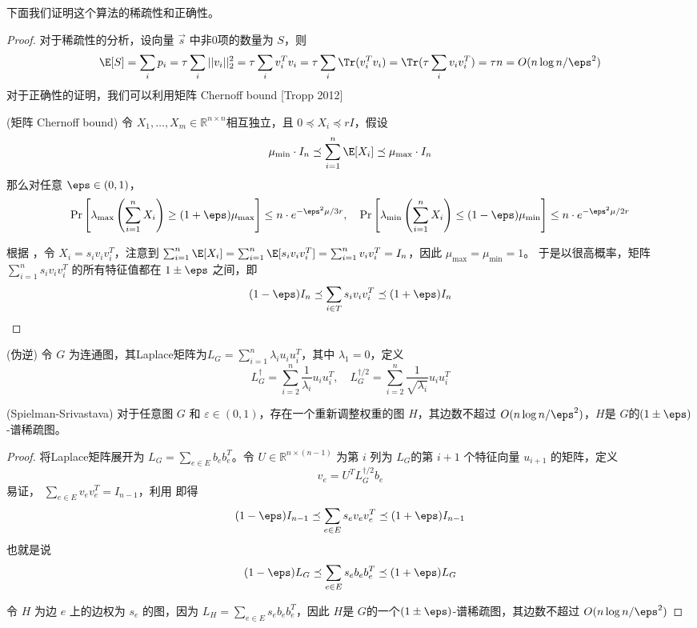 下面我们证明这个算法的稀疏性和正确性。

\begin{proof}
    对于稀疏性的分析，设向量 $\vec{s}$ 中非$0$项的数量为 $S$，则
    \[
    \E[S] =  \sum_i p_i=\tau \sum_i||v_i||_2^2=\tau\sum_i v_i^Tv_i = \tau\sum_i \Tr(v_i^Tv_i) = \Tr(\tau\sum_i v_iv_i^T) =\tau n = O(n\log n/\eps^2)
    \]
    对于正确性的证明，我们可以利用矩阵 Chernoff bound [Tropp 2012]
    \begin{theorem}{(矩阵 Chernoff bound)}
    \label{thm:mathix-chernoff}
        令 $X_1,\dots,X_m\in\mathbb{R}^{n\times n}$相互独立，且 $0\preceq X_i\preceq rI$，假设
        \[
        \mu_{\min}\cdot I_n\preceq \sum_{i=1}^n \E[X_i]\preceq \mu_{\max}\cdot I_n
        \]
        那么对任意 $\eps\in(0,1)$，
        \[
        \Pr\left[\lambda_{\max}\left(\sum_{i=1}^nX_i\right)\geq (1+\eps)\mu_{\max}\right]\leq n\cdot e^{-\eps^2\mu/3r}, \quad \Pr\left[\lambda_{\min}\left(\sum_{i=1}^nX_i\right)\leq (1-\eps)\mu_{\min}\right]\leq n\cdot e^{-\eps^2\mu/2r}
        \]
    \end{theorem}
    根据 ，令 $X_i=s_iv_iv_i^T$，注意到 $\sum_{i=1}^n \E[X_i]=\sum_{i=1}^n\E[s_iv_iv_i^T]=\sum_{i=1}^n v_iv_i^T=I_n$，因此 $\mu_{\max}=\mu_{\min}=1$。
    于是以很高概率，矩阵 $\sum_{i=1}^ns_iv_iv_i^T$ 的所有特征值都在 $1\pm\eps$ 之间，即
    \[
        (1-\eps)I_n\preceq \sum_{i\in T} s_iv_iv_i^T\preceq (1+\eps)I_n
    \]
\end{proof}


\begin{definition}{(伪逆)}
    令 $G$ 为连通图，其Laplace矩阵为$L_G=\sum_{i=1}^n \lambda_i u_iu_i^T$，其中 $\lambda_1=0$，定义
    \[
    L_G^\dagger= \sum_{i=2}^n \frac{1}{\lambda_i} u_iu_i^T,\quad L_G^{\dagger/2}= \sum_{i=2}^n \frac{1}{\sqrt{\lambda_i}} u_iu_i^T
    \]
\end{definition}

\begin{theorem}{(Spielman-Srivastava)}
    对于任意图 $G$ 和 $\varepsilon\in(0,1)$，存在一个重新调整权重的图 $H$，其边数不超过 $O(n\log n /\eps^2)$，$H$是 $G$的$(1\pm \eps)$-谱稀疏图。
\end{theorem}
\begin{proof}
    将Laplace矩阵展开为 $L_G=\sum_{e\in E} b_e b_e^T$。令 $U\in\mathbb{R}^{n\times (n-1)}$ 为第 $i$ 列为 $L_G$的第 $i+1$ 个特征向量 $u_{i+1}$ 的矩阵，定义
    \[
    v_e=U^T L_G^{\dagger/2} b_e
    \]
    易证， $\sum_{e\in E}v_ev_e^T=I_{n-1}$，利用  即得
    \[
    (1-\eps)I_{n-1}\preceq \sum_{e\in E} s_ev_ev_e^T\preceq (1+\eps)I_{n-1}
    \]
    也就是说
    \[
    (1-\eps)L_G\preceq\sum_{e\in E}s_eb_eb_e^T \preceq (1+\eps)L_G
    \]
        
    令 $H$ 为边 $e$ 上的边权为 $s_e$ 的图，因为 $L_H=\sum_{e\in E}s_eb_eb_e^T$，因此 $H$是 $G$的一个$(1\pm\eps)$-谱稀疏图，其边数不超过 $O(n\log n /\eps^2)$
\end{proof}

